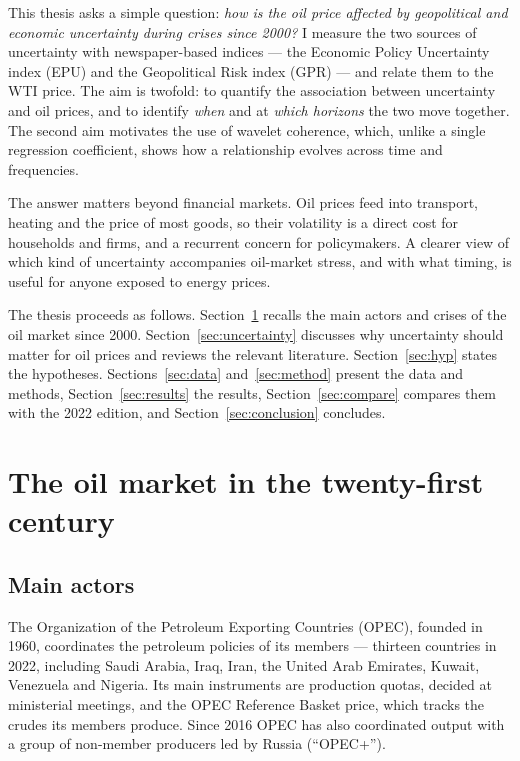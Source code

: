 \documentclass[11pt,a4paper]{article}
\begin{document}
This thesis asks a simple question: \emph{how is the oil price affected by
geopolitical and economic uncertainty during crises since 2000?} I measure the
two sources of uncertainty with newspaper-based indices --- the Economic Policy
Uncertainty index (EPU) and the Geopolitical Risk index (GPR) --- and relate them
to the WTI price. The aim is twofold: to quantify the association between
uncertainty and oil prices, and to identify \emph{when} and at \emph{which
horizons} the two move together. The second aim motivates the use of wavelet
coherence, which, unlike a single regression coefficient, shows how a
relationship evolves across time and frequencies.

The answer matters beyond financial markets. Oil prices feed into transport,
heating and the price of most goods, so their volatility is a direct cost for
households and firms, and a recurrent concern for policymakers. A clearer view of
which kind of uncertainty accompanies oil-market stress, and with what timing, is
useful for anyone exposed to energy prices.

The thesis proceeds as follows. Section~\ref{sec:market} recalls the main actors
and crises of the oil market since 2000. Section~\ref{sec:uncertainty} discusses
why uncertainty should matter for oil prices and reviews the relevant
literature. Section~\ref{sec:hyp} states the hypotheses. Sections~\ref{sec:data}
and~\ref{sec:method} present the data and methods, Section~\ref{sec:results} the
results, Section~\ref{sec:compare} compares them with the 2022 edition, and
Section~\ref{sec:conclusion} concludes.

\section{The oil market in the twenty-first century}\label{sec:market}

\subsection{Main actors}

The Organization of the Petroleum Exporting Countries (OPEC), founded in 1960,
coordinates the petroleum policies of its members --- thirteen countries in 2022,
including Saudi Arabia, Iraq, Iran, the United Arab Emirates, Kuwait, Venezuela
and Nigeria. Its main instruments are production quotas, decided at ministerial
meetings, and the OPEC Reference Basket price, which tracks the crudes its members
produce. Since 2016 OPEC has also coordinated output with a group of non-member
producers led by Russia (``OPEC+'').
\end{document}
